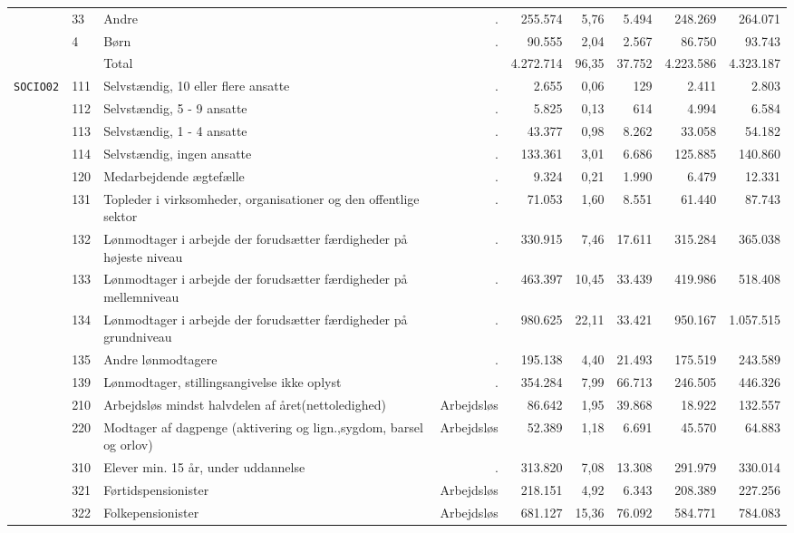\begin{table}[H]
{\begin{tabular}{@{}l|llrrrrrr@{}}
		&	33	&	Andre	&	.	&	255.574	&	5,76	&	5.494	&	248.269	&	264.071	\\	
		&	4	&	Børn	&	.	&	90.555	&	2,04	&	2.567	&	86.750	&	93.743	\\	
		&		&	Total	&		&	4.272.714	&	96,35	&	37.752	&	4.223.586	&	4.323.187	\\	\midrule
	\texttt{SOCIO02}	&	111	&	Selvstændig, 10 eller flere ansatte	&	.	&	2.655	&	0,06	&	129	&	2.411	&	2.803	\\	
		&	112	&	Selvstændig, 5 - 9 ansatte	&	.	&	5.825	&	0,13	&	614	&	4.994	&	6.584	\\	
		&	113	&	Selvstændig, 1 - 4 ansatte	&	.	&	43.377	&	0,98	&	8.262	&	33.058	&	54.182	\\	
		&	114	&	Selvstændig, ingen ansatte	&	.	&	133.361	&	3,01	&	6.686	&	125.885	&	140.860	\\	
		&	120	&	Medarbejdende ægtefælle	&	.	&	9.324	&	0,21	&	1.990	&	6.479	&	12.331	\\	
		&	131	&	Topleder i virksomheder, organisationer og den offentlige sektor	&	.	&	71.053	&	1,60	&	8.551	&	61.440	&	87.743	\\	
		&	132	&	Lønmodtager i arbejde der forudsætter færdigheder på højeste niveau	&	.	&	330.915	&	7,46	&	17.611	&	315.284	&	365.038	\\	
		&	133	&	Lønmodtager i arbejde der forudsætter færdigheder på mellemniveau	&	.	&	463.397	&	10,45	&	33.439	&	419.986	&	518.408	\\	
		&	134	&	Lønmodtager i arbejde der forudsætter færdigheder på grundniveau	&	.	&	980.625	&	22,11	&	33.421	&	950.167	&	1.057.515	\\	
		&	135	&	Andre lønmodtagere	&	.	&	195.138	&	4,40	&	21.493	&	175.519	&	243.589	\\	
		&	139	&	Lønmodtager, stillingsangivelse ikke oplyst	&	.	&	354.284	&	7,99	&	66.713	&	246.505	&	446.326	\\	\cline{2-8}
		&	210	&	Arbejdsløs mindst halvdelen af året(nettoledighed)	&	Arbejdsløs	&	86.642	&	1,95	&	39.868	&	18.922	&	132.557	\\	\cline{2-8}
		&	220	&	Modtager af dagpenge (aktivering og lign.,sygdom, barsel og orlov)	&	Arbejdsløs	&	52.389	&	1,18	&	6.691	&	45.570	&	64.883	\\	
		&	310	&	Elever min. 15 år, under uddannelse	&	.	&	313.820	&	7,08	&	13.308	&	291.979	&	330.014	\\	
		&	321	&	Førtidspensionister	&	Arbejdsløs	&	218.151	&	4,92	&	6.343	&	208.389	&	227.256	\\	
		&	322	&	Folkepensionister	&	Arbejdsløs	&	681.127	&	15,36	&	76.092	&	584.771	&	784.083	\\	

\end{tabular}}
\end{table}
